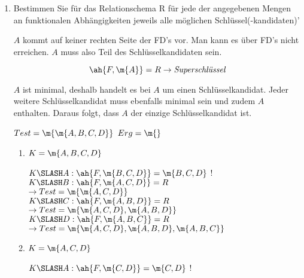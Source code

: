 \documentclass{bschlangaul-aufgabe}
\begin{document}
\begin{enumerate}

%

\item Bestimmen Sie für das Relationschema R für jede der angegebenen
Mengen an funktionalen Abhängigkeiten jeweils alle möglichen
Schlüssel(-kandidaten)'

\begin{liAntwort}

$A$ kommt auf keiner rechten Seite der FD’s vor.
Man kann es über FD's nicht erreichen. $A$ muss also Teil des
Schlüsselkandidaten sein.

\begin{displaymath}
\ah{F, \m{A}} = R \rightarrow \textit{Superschlüssel}
\end{displaymath}

$A$ ist minimal, deshalb handelt es bei $A$ um einen Schlüsselkandidat.
Jeder weitere Schlüsselkandidat muss ebenfalls minimal sein und zudem
$A$ enthalten. Daraus folgt, dass $A$ der einzige Schlüsselkandidat ist.

%


$Test = \m{\m{A, B, C, D}}$ $Erg = \m{}$

\begin{enumerate}


\item $K = \m{A, B, C, D}$

$K \SLASH A: \ah{F, \m{B, C, D}} = \m{B, C, D}$ !\\

$K \SLASH B: \ah{F, \m{A, C, D}} = R$\\
$\rightarrow Test = \m{\m{A, C, D}}$ \\

$K \SLASH C: \ah{F, \m{A, B, D}} = R$\\
$\rightarrow Test = \m{\m{A, C, D}, \m{A, B, D}}$ \\

$K \SLASH D: \ah{F, \m{A, B, C}} = R$\\
$\rightarrow Test = \m{\m{A, C, D}, \m{A, B, D}, \m{A, B, C}}$ \\


\item $K = \m{A, C, D}$

$K \SLASH A: \ah{F, \m{C, D}} = \m{C, D}$ !\\


\end{enumerate}
\end{liAntwort}
\end{enumerate}
\end{document}
